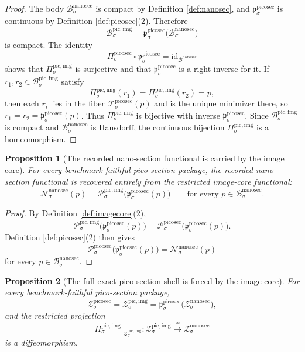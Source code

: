 \documentclass[11pt]{article}
\newcommand{\NanoSectionBody}[1]{\mathcal B_{#1}^{\mathrm{nanosec}}}
\newcommand{\NanoSectionFunctional}[1]{\mathscr N_{#1}^{\mathrm{nanosec}}}
\newcommand{\NanoSectionShell}[1]{\mathcal Z_{#1}^{\mathrm{nanosec}}}
\newcommand{\PicoSectionProj}[1]{\Pi_{#1}^{\mathrm{picosec}}}
\newcommand{\PicoSectionFiber}[2]{\mathcal F_{#1}^{\mathrm{picosec}}(#2)}
\newcommand{\PicoSectionNanoMin}[1]{\mathfrak p_{#1}^{\mathrm{picosec}}}
\newcommand{\PicoSectionFunctional}[1]{\mathscr P_{#1}^{\mathrm{picosec}}}
\newcommand{\PicoSectionShell}[1]{\mathcal Z_{#1}^{\mathrm{picosec}}}
\newcommand{\PicoImgBody}[1]{\mathcal B_{#1}^{\mathrm{pic,img}}}
\newcommand{\PicoImgProj}[1]{\Pi_{#1}^{\mathrm{pic,img}}}
\newcommand{\PicoImgFunctional}[1]{\mathscr P_{#1}^{\mathrm{pic,img}}}
\newcommand{\PicoImgShell}[1]{\mathcal Z_{#1}^{\mathrm{pic,img}}}
\newtheorem{proposition}{Proposition}
\begin{document}
\begin{proof}
The body \(\NanoSectionBody{\sigma}\) is compact by Definition \ref{def:nanosec}, and \(\PicoSectionNanoMin{\sigma}\) is continuous by Definition \ref{def:picosec}(2). Therefore
\[
\PicoImgBody{\sigma}
=
\PicoSectionNanoMin{\sigma}\bigl(\NanoSectionBody{\sigma}\bigr)
\]
is compact. The identity
\[
\PicoSectionProj{\sigma}\circ\PicoSectionNanoMin{\sigma}
=
\mathrm{id}_{\NanoSectionBody{\sigma}}
\]
shows that \(\PicoImgProj{\sigma}\) is surjective and that \(\PicoSectionNanoMin{\sigma}\) is a right inverse for it. If \(r_{1},r_{2}\in\PicoImgBody{\sigma}\) satisfy
\[
\PicoImgProj{\sigma}(r_{1})=\PicoImgProj{\sigma}(r_{2})=p,
\]
then each \(r_{i}\) lies in the fiber \(\PicoSectionFiber{\sigma}{p}\) and is the unique minimizer there, so \(r_{1}=r_{2}=\PicoSectionNanoMin{\sigma}(p)\). Thus \(\PicoImgProj{\sigma}\) is bijective with inverse \(\PicoSectionNanoMin{\sigma}\). Since \(\PicoImgBody{\sigma}\) is compact and \(\NanoSectionBody{\sigma}\) is Hausdorff, the continuous bijection \(\PicoImgProj{\sigma}\) is a homeomorphism.
\end{proof}

\begin{proposition}[The recorded nano-section functional is carried by the image core]
\label{prop:functional}
For every benchmark-faithful pico-section package, the recorded nano-section functional is recovered entirely from the restricted image-core functional:
\[
\NanoSectionFunctional{\sigma}(p)
=
\PicoImgFunctional{\sigma}\bigl(\PicoSectionNanoMin{\sigma}(p)\bigr)
\qquad
\text{for every }p\in\NanoSectionBody{\sigma}.
\]
\end{proposition}

\begin{proof}
By Definition \ref{def:imagecore}(2),
\[
\PicoImgFunctional{\sigma}\bigl(\PicoSectionNanoMin{\sigma}(p)\bigr)
=
\PicoSectionFunctional{\sigma}\bigl(\PicoSectionNanoMin{\sigma}(p)\bigr).
\]
Definition \ref{def:picosec}(2) then gives
\[
\PicoSectionFunctional{\sigma}\bigl(\PicoSectionNanoMin{\sigma}(p)\bigr)
=
\NanoSectionFunctional{\sigma}(p)
\]
for every \(p\in\NanoSectionBody{\sigma}\).
\end{proof}

\begin{proposition}[The full exact pico-section shell is forced by the image core]
\label{prop:shell}
For every benchmark-faithful pico-section package,
\[
\PicoSectionShell{\sigma}
=
\PicoImgShell{\sigma}
=
\PicoSectionNanoMin{\sigma}\bigl(\NanoSectionShell{\sigma}\bigr),
\]
and the restricted projection
\[
\PicoImgProj{\sigma}\big|_{\PicoImgShell{\sigma}}
:
\PicoImgShell{\sigma}\xrightarrow{\cong}\NanoSectionShell{\sigma}
\]
is a diffeomorphism.
\end{proposition}
\end{document}
